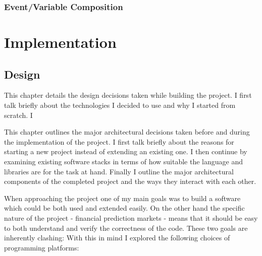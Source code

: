 \documentclass[bsc,frontabs,twoside,singlespacing,parskip,deptreport]{infthesis}     %
\begin{document}
\subsection{Event/Variable Composition}

\chapter{Implementation}

\section{Design}
	This chapter details the design decisions taken while building the project. I first talk briefly about the technologies I decided to use and why I started from scratch. I 

	This chapter outlines the major architectural decisions taken before and during the implementation of the project. I first talk briefly about the reasons for starting a new project instead of extending an existing one. I then continue by examining existing software stacks in terms of how suitable the language and libraries are for the task at hand. Finally I outline the major architectural components of the completed project and the ways they interact with each other. 

	When approaching the project one of my main goals was to build a software which could be both used and extended easily. On the other hand the specific nature of the project - financial prediction markets - means that it should be easy to both understand and verify the correctness of the code. These two goals are inherently clashing: 
With this in mind I explored the following choices of programming platforms:
\end{document}
